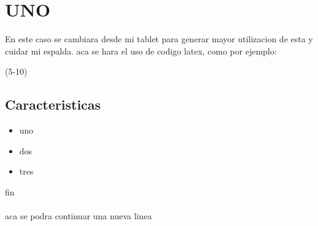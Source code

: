 \section{UNO}
   En este caso se cambiara desde mi tablet para generar mayor utilizacion de esta y cuidar mi espalda.
			aca se hara el uso de codigo latex, como por ejemplo:

\lipsum(5-10)

\subsection{Caracteristicas}
\begin{itemize}
\item uno
\item dos
\item tres
\end{itemize}
fin\\
\\
aca se podra continuar una nueva linea


